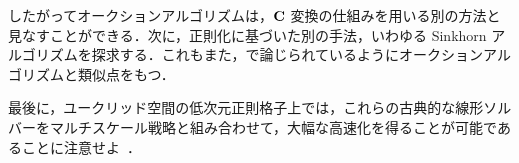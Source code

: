 したがってオークションアルゴリズムは，$\mathrm{\textbf{C}}$ 変換の仕組みを用いる別の方法と見なすことができる．次に，正則化に基づいた別の手法，いわゆる Sinkhorn アルゴリズムを探求する．これもまた，\citep{schmitzer2016stabilized}で論じられているようにオークションアルゴリズムと類似点をもつ．
%

最後に，ユークリッド空間の低次元正則格子上では，これらの古典的な線形ソルバーをマルチスケール戦略と組み合わせて，大幅な高速化を得ることが可能であることに注意せよ~\citep{schmitzer2016sparse,oberman2015efficient}．




